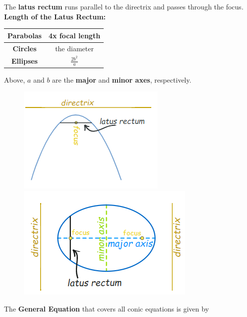         \noindent The \textbf{latus rectum} runs parallel to the directrix and passes through the focus. \\
        \noindent \textbf{Length of the Latus Rectum:} \\

        \begin{center}
            \begin{tabular}{|c|c|}
                \hline
                \textbf{Parabolas} & 4x focal length  \\
                \hline
                \textbf{Circles}   & the diameter     \\
                \hline
                \textbf{Ellipses}  & $\frac{2b^2}{a}$ \\
                \hline
            \end{tabular}
        \end{center}

        \noindent Above, $a$ and $b$ are the \textbf{major} and \textbf{minor axes}, respectively.

        \begin{figure} [hbt!]
            \centering
            \includegraphics[scale = 0.6] {Resources/Unit10Conics/latrect.PNG}
            \includegraphics[scale = 0.6] {Resources/Unit10Conics/lactrect2.PNG}
        \end{figure}

        \noindent The \textbf{General Equation} that covers all conic equations is given by \\

